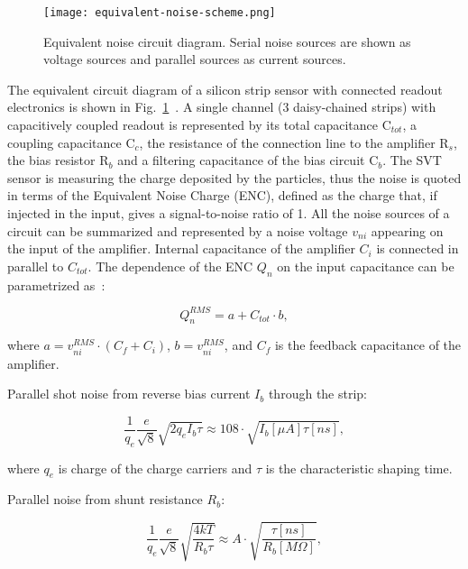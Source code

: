 \begin{figure}[hbt] 
\centering 
\texttt{[image: equivalent-noise-scheme.png]}
\caption{Equivalent noise circuit diagram. Serial noise sources are shown as voltage sources and
parallel sources as current sources.}
\label{fig:equivalent-noise-scheme}
\end{figure}

The equivalent circuit diagram of a silicon strip sensor with connected readout electronics is shown in Fig.~\ref{fig:equivalent-noise-scheme}~\cite{SPIELER}. A single channel (3 daisy-chained strips) with capacitively coupled readout is represented by its total capacitance C$_{tot}$, a coupling capacitance C$_c$, the resistance of the connection line to the amplifier R$_s$, the bias resistor R$_b$ and a filtering capacitance of the bias circuit C$_b$. The SVT sensor is measuring the charge deposited by the particles, thus the noise is quoted in terms of the Equivalent Noise Charge (ENC), defined as the charge that, if injected in the input, gives a signal-to-noise ratio of 1. All the noise sources of a circuit can be summarized and represented by a noise voltage $v_{ni}$ appearing on the input of the amplifier. Internal capacitance of the amplifier $C_i$ is connected in parallel to $C_{tot}$. The dependence of the ENC $Q_n$ on the input capacitance can be parametrized as~\cite{BLOCHTHESIS}:

\begin{equation} Q^{RMS}_{n}=a+C_{tot}{\cdot}b  \label{eq:qn},
\end{equation}

where $a = v^{RMS}_{ni} \cdot (C_{f} + C_{i})$, $b = v^{RMS}_{ni}$, and $C_f$ is the feedback capacitance of the amplifier.

Parallel shot noise from reverse bias current $I_b$ through the strip:

\begin{equation} \frac{1}{q_e}\frac{e}{\sqrt{8}}\sqrt{2q_eI_b\tau} \approx 108\cdot\sqrt{I_b[\mu A]\tau [ns]}  \label{eq:bias},
\end{equation}

where $q_e$ is charge of the charge carriers and $\tau$ is the characteristic shaping time.

Parallel noise from shunt resistance $R_b$:

\begin{equation} \frac{1}{q_e}\frac{e}{\sqrt{8}}\sqrt{\frac{4kT}{R_b\tau}} \approx A\cdot\sqrt{\frac{\tau [ns]}{R_b[M \Omega]}} \label{eq:shunt},
\end{equation}

